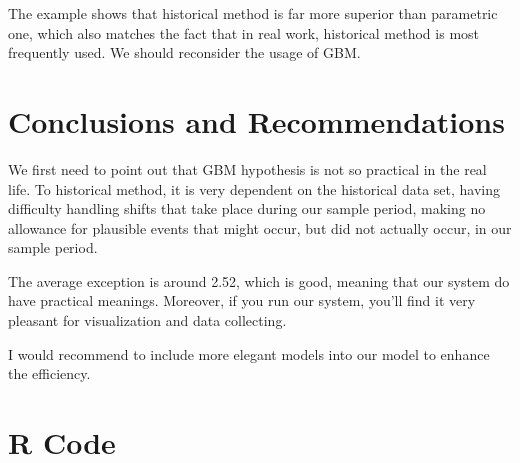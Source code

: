 \documentclass[letterpaper,11pt, oneside]{layout}
\begin{document}
The example shows that historical method is far more superior than parametric one, which also matches the fact that in real work, historical method is most frequently used. We should reconsider the usage of GBM.
    


\begingroup
\renewcommand{\clearpage}{}
\chapter{Conclusions and Recommendations}
\label{chap:cr}
\endgroup

We first need to point out that GBM hypothesis is not so practical in the real life. To historical method,
it is very dependent on the historical data set, having difficulty handling shifts that take place during our sample period, making no allowance for plausible events that might occur, but did not actually occur, in our sample period.

The average exception is around 2.52, which is good, meaning that our system do have practical meanings. Moreover, if you run our system, you'll find it very pleasant for visualization and data collecting.

I would recommend to include more elegant models into our model to enhance the efficiency.


\appendix
\renewcommand\theequation{\Alph{chapter}--\arabic{equation}}
\renewcommand\thefigure{\Alph{chapter}--\arabic{figure}}
\renewcommand\thetable{\Alph{chapter}--\arabic{table}}

%

\chapter{R Code}
\label{app:code}

\end{document}
